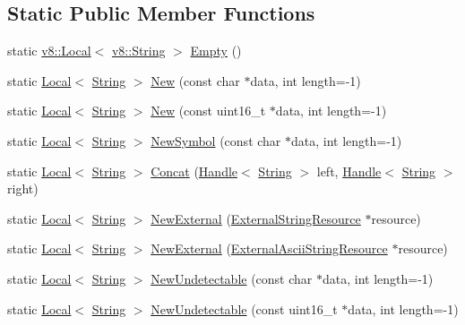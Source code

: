 \subsection*{Static Public Member Functions}
\begin{DoxyCompactItemize}
\item 
static \hyperlink{classv8_1_1_local}{v8\+::\+Local}$<$ \hyperlink{classv8_1_1_string}{v8\+::\+String} $>$ \hyperlink{classv8_1_1_string_a5f222b35243cdfc0bb2c12a300d62d11}{Empty} ()
\item 
static \hyperlink{classv8_1_1_local}{Local}$<$ \hyperlink{classv8_1_1_string}{String} $>$ \hyperlink{classv8_1_1_string_a66188e5be9378cad8cbf953053de86bc}{New} (const char $\ast$data, int length=-\/1)
\item 
static \hyperlink{classv8_1_1_local}{Local}$<$ \hyperlink{classv8_1_1_string}{String} $>$ \hyperlink{classv8_1_1_string_a974c70e8e7ee9c36d064555953fc9a6d}{New} (const uint16\+\_\+t $\ast$data, int length=-\/1)
\item 
static \hyperlink{classv8_1_1_local}{Local}$<$ \hyperlink{classv8_1_1_string}{String} $>$ \hyperlink{classv8_1_1_string_ad190aa56ee2e94a429df13c84b19f025}{New\+Symbol} (const char $\ast$data, int length=-\/1)
\item 
static \hyperlink{classv8_1_1_local}{Local}$<$ \hyperlink{classv8_1_1_string}{String} $>$ \hyperlink{classv8_1_1_string_a3d0b9c9208cf5054adb048e360fb73ff}{Concat} (\hyperlink{classv8_1_1_handle}{Handle}$<$ \hyperlink{classv8_1_1_string}{String} $>$ left, \hyperlink{classv8_1_1_handle}{Handle}$<$ \hyperlink{classv8_1_1_string}{String} $>$ right)
\item 
static \hyperlink{classv8_1_1_local}{Local}$<$ \hyperlink{classv8_1_1_string}{String} $>$ \hyperlink{classv8_1_1_string_a5b98a12b3c09f22597d2ff3f9c9f2f2d}{New\+External} (\hyperlink{classv8_1_1_string_1_1_external_string_resource}{External\+String\+Resource} $\ast$resource)
\item 
static \hyperlink{classv8_1_1_local}{Local}$<$ \hyperlink{classv8_1_1_string}{String} $>$ \hyperlink{classv8_1_1_string_adbcec9a915fabf0235f4f688cd7b4f32}{New\+External} (\hyperlink{classv8_1_1_string_1_1_external_ascii_string_resource}{External\+Ascii\+String\+Resource} $\ast$resource)
\item 
static \hyperlink{classv8_1_1_local}{Local}$<$ \hyperlink{classv8_1_1_string}{String} $>$ \hyperlink{classv8_1_1_string_a8a6781029989d17399af784d71818d9d}{New\+Undetectable} (const char $\ast$data, int length=-\/1)
\item 
static \hyperlink{classv8_1_1_local}{Local}$<$ \hyperlink{classv8_1_1_string}{String} $>$ \hyperlink{classv8_1_1_string_a28dc24076f4954a1dba0d70a6ecb0b04}{New\+Undetectable} (const uint16\+\_\+t $\ast$data, int length=-\/1)
\end{DoxyCompactItemize}


